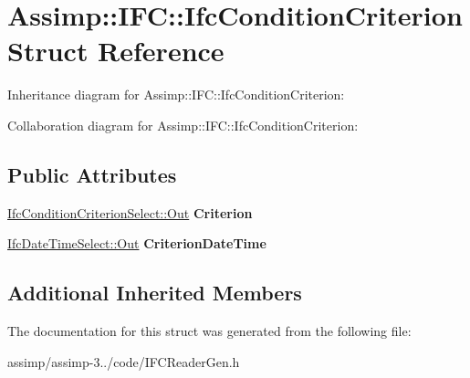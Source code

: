 \hypertarget{struct_assimp_1_1_i_f_c_1_1_ifc_condition_criterion}{\section{Assimp\+:\+:I\+F\+C\+:\+:Ifc\+Condition\+Criterion Struct Reference}
\label{struct_assimp_1_1_i_f_c_1_1_ifc_condition_criterion}
}


Inheritance diagram for Assimp\+:\+:I\+F\+C\+:\+:Ifc\+Condition\+Criterion\+:


Collaboration diagram for Assimp\+:\+:I\+F\+C\+:\+:Ifc\+Condition\+Criterion\+:
\subsection*{Public Attributes}
\begin{DoxyCompactItemize}
\item 
\hypertarget{struct_assimp_1_1_i_f_c_1_1_ifc_condition_criterion_a6b7a435cfb368ea1b8e0d23a3564e993}{\hyperlink{classboost_1_1shared__ptr}{Ifc\+Condition\+Criterion\+Select\+::\+Out} {\bfseries Criterion}}\label{struct_assimp_1_1_i_f_c_1_1_ifc_condition_criterion_a6b7a435cfb368ea1b8e0d23a3564e993}

\item 
\hypertarget{struct_assimp_1_1_i_f_c_1_1_ifc_condition_criterion_a72f385ec97ed7d4c10b026a585e0ba11}{\hyperlink{classboost_1_1shared__ptr}{Ifc\+Date\+Time\+Select\+::\+Out} {\bfseries Criterion\+Date\+Time}}\label{struct_assimp_1_1_i_f_c_1_1_ifc_condition_criterion_a72f385ec97ed7d4c10b026a585e0ba11}

\end{DoxyCompactItemize}
\subsection*{Additional Inherited Members}


The documentation for this struct was generated from the following file\+:\begin{DoxyCompactItemize}
\item 
assimp/assimp-\/3../code/I\+F\+C\+Reader\+Gen.\+h\end{DoxyCompactItemize}
